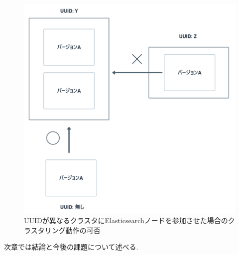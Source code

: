 \begin{figure}[H]
  \begin{center}
    \includegraphics[width=120mm]{sotu/figure/youshi-4.png}
    \caption{UUIDが異なるクラスタにElasticsearchノードを参加させた場合のクラスタリング動作の可否}
    \label{4-p17}
  \end{center}
\end{figure}

次章では結論と今後の課題について述べる.
